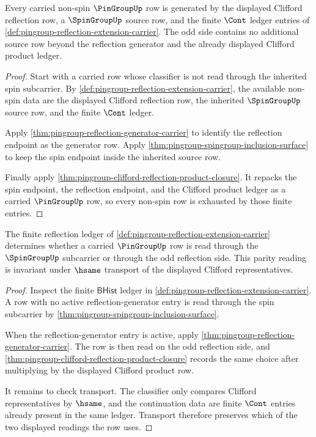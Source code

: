 \begin{theorem}
\label{thm:pingroup-odd-reflection-coset-exhaustion}
Every carried non-spin $\PinGroupUp$ row is generated by the displayed
Clifford reflection row, a $\SpinGroupUp$ source row, and the finite $\Cont$
ledger entries of \autoref{def:pingroup-reflection-extension-carrier}.  The
odd side contains no additional source row beyond the reflection generator
and the already displayed Clifford product ledger.
\end{theorem}
\begin{proof}
Start with a carried row whose classifier is not read through the inherited
spin subcarrier.  By \autoref{def:pingroup-reflection-extension-carrier}, the
available non-spin data are the displayed Clifford reflection row, the
inherited $\SpinGroupUp$ source row, and the finite $\Cont$ ledger.

Apply \autoref{thm:pingroup-reflection-generator-carrier} to identify the
reflection endpoint as the generator row.  Apply
\autoref{thm:pingroup-spingroup-inclusion-surface} to keep the spin endpoint
inside the inherited source row.

Finally apply
\autoref{thm:pingroup-clifford-reflection-product-closure}.  It repacks the
spin endpoint, the reflection endpoint, and the Clifford product ledger as a
carried $\PinGroupUp$ row, so every non-spin row is exhausted by those finite
entries.
\end{proof}

\begin{theorem}
\label{thm:pingroup-reflection-parity-determinacy}
The finite reflection ledger of
\autoref{def:pingroup-reflection-extension-carrier} determines whether a
carried $\PinGroupUp$ row is read through the $\SpinGroupUp$ subcarrier or
through the odd reflection side.  This parity reading is invariant under
$\hsame$ transport of the displayed Clifford representatives.
\end{theorem}
\begin{proof}
Inspect the finite $\mathsf{BHist}$ ledger in
\autoref{def:pingroup-reflection-extension-carrier}.  A row with no active
reflection-generator entry is read through the spin subcarrier by
\autoref{thm:pingroup-spingroup-inclusion-surface}.

When the reflection-generator entry is active, apply
\autoref{thm:pingroup-reflection-generator-carrier}.  The row is then read on
the odd reflection side, and
\autoref{thm:pingroup-clifford-reflection-product-closure} records the same
choice after multiplying by the displayed Clifford product row.

It remains to check transport.  The classifier only compares Clifford
representatives by $\hsame$, and the continuation data are finite $\Cont$
entries already present in the same ledger.  Transport therefore preserves
which of the two displayed readings the row uses.
\end{proof}

